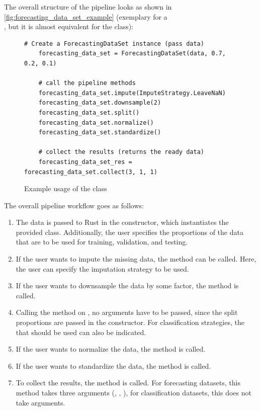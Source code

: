 \documentclass[review]{AIM_report}
\begin{document}
The overall structure of the pipeline looks as shown in \autoref{fig:forecasting_data_set_example} (exemplary for a \\
\forecastingDataSet, but it is almost equivalent for the \classificationDataSet class):
\begin{figure}[H]
    \begin{lstlisting}[style=python]
    # Create a ForecastingDataSet instance (pass data)
    forecasting_data_set = ForecastingDataSet(data, 0.7, 0.2, 0.1)

    # call the pipeline methods
    forecasting_data_set.impute(ImputeStrategy.LeaveNaN)
    forecasting_data_set.downsample(2)
    forecasting_data_set.split()
    forecasting_data_set.normalize()
    forecasting_data_set.standardize()

    # collect the results (returns the ready data)
    forecasting_data_set_res = forecasting_data_set.collect(3, 1, 1)
    \end{lstlisting}
    \caption{Example usage of the \forecastingDataSet class}
    \label{fig:forecasting_data_set_example}
\end{figure}

The overall pipeline workflow goes as follows:
\begin{enumerate}
    \item The data is passed to Rust in the constructor, which instantiates the provided class. Additionally, the user specifies the proportions of the data that are to be used for training, validation, and testing.
    \item If the user wants to impute the missing data, the \imputeStrategy method can be called. Here, the user can specify the imputation strategy to be used.
    \item If the user wants to downsample the data by some factor, the \downsample method is called.
    \item Calling the \splitShort method on \forecastingDataSet, no arguments have to be passed, since the split proportions are passed in the constructor. For classification strategies, the \splitStrategy that should be used can also be indicated.
    \item If the user wants to normalize the data, the \normalize method is called.
    \item If the user wants to standardize the data, the \standardize method is called.
    \item To collect the results, the \collect method is called. For forecasting datasets, this method takes three arguments (\pastWindow, \futureHorizon, \stride), for classification datasets, this does not take arguments.
\end{enumerate}
\end{document}
